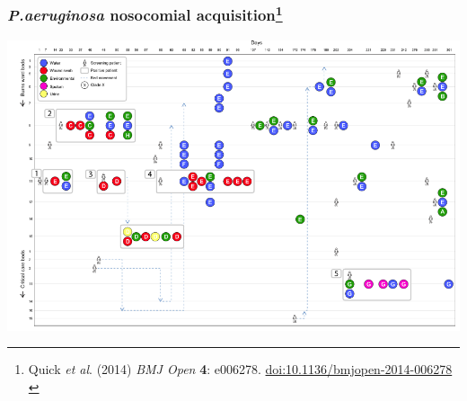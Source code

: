 \begin{frame}
  \frametitle{\textit{P.aeruginosa} nosocomial acquisition\footnote{\tiny{Quick \textit{et al}. (2014) \textit{BMJ Open} \textbf{4}: e006278. \href{http://dx.doi.org/10.1136/bmjopen-2014-006278}{doi:10.1136/bmjopen-2014-006278}}\\}}
  \begin{center}
    \includegraphics[width=1\textwidth]{images/quick_fig2}
  \end{center}
\end{frame}

